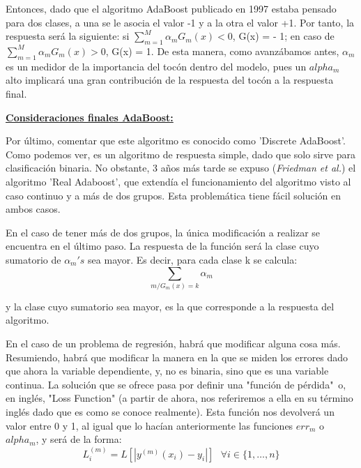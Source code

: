 \documentclass[12pt,twoside]{article}
\begin{document}
Entonces, dado que el algoritmo AdaBoost publicado en 1997 estaba pensado para dos clases, a una se le asocia el valor -1 y a la otra el valor +1. Por tanto, la respuesta será la siguiente: si $\sum_{m=1}^M \alpha_m G_m(x) < 0$, G(x) = - 1; en caso de $\sum_{m=1}^M \alpha_m G_m(x) > 0$, G(x) = 1. De esta manera, como avanzábamos antes, $\alpha_m$ es un medidor de la importancia del tocón dentro del modelo, pues un $alpha_m$ alto implicará una gran contribución de la respuesta del tocón a la respuesta final.

\bigskip \bigskip \bigskip \bigskip \bigskip

\textbf{\underline{Consideraciones finales AdaBoost:}}

Por último, comentar que este algoritmo es conocido como 'Discrete AdaBoost'. Como podemos ver, es un algoritmo de respuesta simple, dado que solo sirve para clasificación binaria. No obstante, 3 años más tarde se expuso (\textit{Friedman et al.}) el algoritmo 'Real Adaboost', que extendía el funcionamiento del algoritmo visto al caso continuo y a más de dos grupos. Esta problemática tiene fácil solución en ambos casos.

En el caso de tener más de dos grupos, la única modificación a realizar se encuentra en el último paso. La respuesta de la función será la clase cuyo sumatorio de $\alpha_m's$ sea mayor. Es decir, para cada clase k se calcula:
\begin{equation*}
\sum_{m / G_m(x) = k} \alpha_m
\end{equation*}

\noindent
y la clase cuyo sumatorio sea mayor, es la que corresponde a la respuesta del algoritmo.

En el caso de un problema de regresión, habrá que modificar alguna cosa más. Resumiendo,  habrá que modificar la manera en la que se miden los errores dado que ahora la variable dependiente, y, no es binaria, sino que es una variable continua. La solución que se ofrece pasa por definir una "función de pérdida"$\,$ o, en inglés, "Loss Function" (a partir de ahora, nos referiremos a ella en su término inglés dado que es como se conoce realmente). Esta función nos devolverá un valor entre 0 y 1, al igual que lo hacían anteriormente las funciones $err_m$ o $alpha_m$, y será de la forma:
\begin{equation*}
L_i^{(m)} = L \left[ |y^{(m)}(x_i) - y_i| \right] \, \, \, \, \forall i \in \{ 1, \dots, n \}
\end{equation*}
\end{document}
